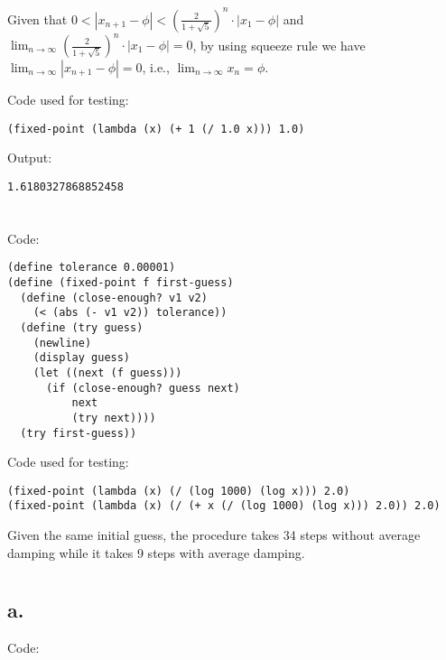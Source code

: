 \documentclass[../main.tex]{subfiles}
\begin{document}
Given that $0<|x_{n+1}-\phi|<\left(\frac{2}{1+\sqrt{5}}\right)^n\cdot|x_1 - \phi|$ and $\lim_{n\to\infty}\left(\frac{2}{1+\sqrt{5}}\right)^n\cdot|x_1 - \phi|=0$, by using squeeze rule we have $\lim_{n\to\infty}|x_{n+1}-\phi|=0$, i.e., $\lim_{n\to\infty}x_n=\phi$.

Code used for testing:

\begin{lstlisting}
(fixed-point (lambda (x) (+ 1 (/ 1.0 x))) 1.0)
\end{lstlisting}

Output:

\begin{lstlisting}
1.6180327868852458
\end{lstlisting}


\section{}

Code:

\begin{lstlisting}
(define tolerance 0.00001)
(define (fixed-point f first-guess)
  (define (close-enough? v1 v2)
    (< (abs (- v1 v2)) tolerance))
  (define (try guess)
    (newline)
    (display guess)
    (let ((next (f guess)))
      (if (close-enough? guess next)
          next
          (try next))))
  (try first-guess))
\end{lstlisting}

Code used for testing:

\begin{lstlisting}
(fixed-point (lambda (x) (/ (log 1000) (log x))) 2.0)
(fixed-point (lambda (x) (/ (+ x (/ (log 1000) (log x))) 2.0)) 2.0)
\end{lstlisting}

Given the same initial guess, the procedure takes 34 steps without
 average damping while it takes 9 steps with average damping.


\section{}

\subsection*{a.}

Code:
\end{document}
